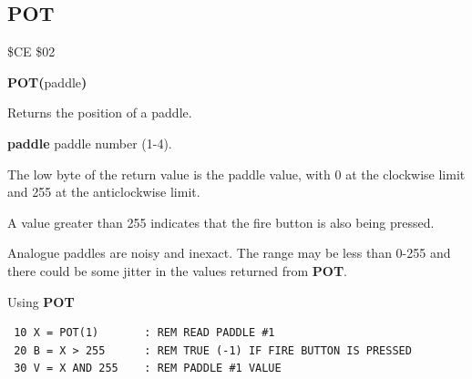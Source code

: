 \subsection{POT}
\begin{description}[leftmargin=2cm,style=nextline]
\item [Token:] \$CE \$02
\item [Format:] {\bf POT(}paddle{\bf)}
\item [Usage:]  Returns the position of a paddle.

                {\bf paddle} paddle number (1-4).

                The low byte of the return value is the
                paddle value, with 0 at the clockwise limit and 255 at the
                anticlockwise limit.

                A value greater than 255 indicates that the fire button
                is also being pressed.

\item [Remarks:] Analogue paddles are noisy and inexact.
                 The range may be less than 0-255 and there
                 could be some jitter in the values returned from {\bf POT}.


\item [Example:] Using {\bf POT}

\begin{tcolorbox}[colback=black,coltext=white]
\verbatimfont{\codefont}
\begin{verbatim}
 10 X = POT(1)       : REM READ PADDLE #1
 20 B = X > 255      : REM TRUE (-1) IF FIRE BUTTON IS PRESSED
 30 V = X AND 255    : REM PADDLE #1 VALUE
\end{verbatim}
\end{tcolorbox}
\end{description}


\newpage
